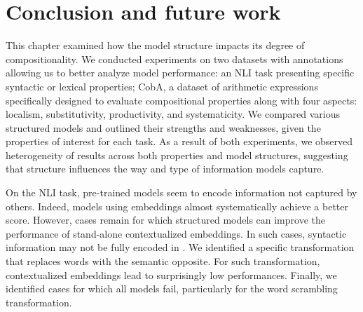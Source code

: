 
\section{Conclusion and future work}

This chapter examined how the model structure impacts its degree of compositionality. We conducted experiments on two datasets with annotations allowing us to better analyze model performance: an NLI task presenting specific syntactic or lexical properties; CobA, a dataset of arithmetic expressions specifically designed to evaluate compositional properties along with four aspects: localism, substitutivity, productivity, and systematicity. We compared various structured models and outlined their strengths and weaknesses, given the properties of interest for each task. As a result of both experiments, we observed heterogeneity of results across both properties and model structures, suggesting that structure influences the way and type of information models capture.

On the NLI task, pre-trained \bert models seem to encode information not captured by others. Indeed, models using \bert embeddings almost systematically achieve a better score. However, cases remain for which structured models can improve the performance of stand-alone contextualized embeddings. In such cases, syntactic information may not be fully encoded in \bert. We identified a specific transformation that replaces words with the semantic opposite. For such transformation, \bert contextualized embeddings lead to surprisingly low performances. Finally, we identified cases for which all models fail, particularly for the word scrambling transformation. 


